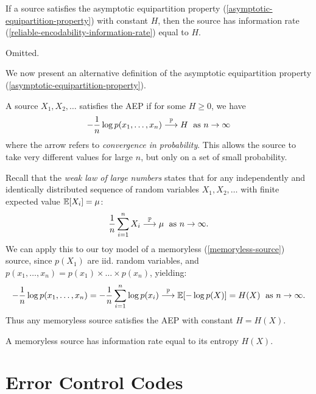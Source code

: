 \documentclass{article}
\begin{document}
\begin{theorem}
    If a source satisfies the asymptotic equipartition property
    (\ref{asymptotic-equipartition-property})
    with constant $H$,
    then the source has information rate
    (\ref{reliable-encodability-information-rate})
    equal to $H$.
\end{theorem}
\begin{prf}
    Omitted.
\end{prf}

We now present an alternative definition
of the asymptotic equipartition property
(\ref{asymptotic-equipartition-property}).

\begin{definition}
    A source $X_1, X_2, \dots$
    satisfies the AEP if for some $H \geq 0$, we have
    \[
	- \frac{1}{n} \log p(x_1, \dots, x_n)
	\stackrel{\mathbb{P}}{\longrightarrow} H
	\; \text{ as $n \to \infty$}
	\]
	where the arrow refers to \textit{convergence in probability}.
	This allows the source to take very different values for large $n$,
	but only on a set of small probability.
\end{definition}

\begin{remark}
	\label{weak-law-of-large-numbers}
    Recall that the \textit{weak law of large numbers} states that for any
    independently and identically distributed sequence of random variables
    $X_1, X_2, \dots$
    with finite expected value $\mathbb{E}[X_i] = \mu$:
    \[
	\frac{1}{n} \sum_{i=1}^n X_i
	\stackrel{\mathbb{P}}{\longrightarrow} \mu
	\; \text{ as $n \to \infty$}.
	\]
	We can apply this to our toy model of a memoryless (\ref{memoryless-source})
	source, since $p(X_1)$ are iid. random variables,
	and $p(x_1, \dots, x_n) = p(x_1) \times \dots \times p(x_n)$, yielding:
	\[
	- \frac{1}{n} \log p(x_1, \dots, x_n) =
	- \frac{1}{n} \sum_{i=1}^n \log p(x_i)
	\stackrel{\mathbb{P}}{\longrightarrow} \mathbb{E}[-\log p(X)] = H(X)
	\; \text{ as $n \to \infty$}.
	\]
	Thus any memoryless source satisfies the AEP with constant $H = H(X)$.
\end{remark}

\begin{corollary}
    A memoryless source has information rate equal to its entropy $H(X)$.
\end{corollary}


\pagebreak
\section{Error Control Codes}
\end{document}
